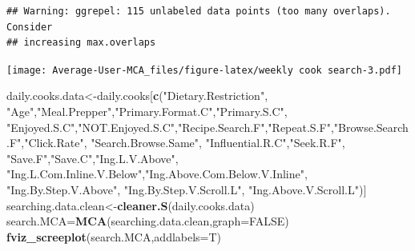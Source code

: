 \documentclass[
]{article}
\newenvironment{Shaded}{\begin{snugshade}}{\end{snugshade}}
\newcommand{\DataTypeTok}[1]{\textcolor[rgb]{0.13,0.29,0.53}{#1}}
\newcommand{\KeywordTok}[1]{\textcolor[rgb]{0.13,0.29,0.53}{\textbf{#1}}}
\newcommand{\NormalTok}[1]{#1}
\newcommand{\OtherTok}[1]{\textcolor[rgb]{0.56,0.35,0.01}{#1}}
\newcommand{\StringTok}[1]{\textcolor[rgb]{0.31,0.60,0.02}{#1}}
\begin{document}
\begin{Shaded}
\end{Shaded}

\begin{verbatim}
## Warning: ggrepel: 115 unlabeled data points (too many overlaps). Consider
## increasing max.overlaps
\end{verbatim}

\texttt{[image: Average-User-MCA\_files/figure-latex/weekly cook search-3.pdf]}

\begin{Shaded}
\begin{Highlighting}[]
\NormalTok{daily.cooks.data<-daily.cooks[}\KeywordTok{c}\NormalTok{(}\StringTok{"Dietary.Restriction"}\NormalTok{, }\StringTok{"Age"}\NormalTok{,}\StringTok{"Meal.Prepper"}\NormalTok{,}\StringTok{"Primary.Format.C"}\NormalTok{,}\StringTok{"Primary.S.C"}\NormalTok{,}
            \StringTok{"Enjoyed.S.C"}\NormalTok{,}\StringTok{"NOT.Enjoyed.S.C"}\NormalTok{,}\StringTok{"Recipe.Search.F"}\NormalTok{,}\StringTok{"Repeat.S.F"}\NormalTok{,}\StringTok{"Browse.Search.F"}\NormalTok{,}\StringTok{"Click.Rate"}\NormalTok{,}
            \StringTok{"Search.Browse.Same"}\NormalTok{, }\StringTok{"Influential.R.C"}\NormalTok{,}\StringTok{"Seek.R.F"}\NormalTok{, }\StringTok{"Save.F"}\NormalTok{,}\StringTok{"Save.C"}\NormalTok{,}\StringTok{"Ing.L.V.Above"}\NormalTok{,}
            \StringTok{"Ing.L.Com.Inline.V.Below"}\NormalTok{,}\StringTok{"Ing.Above.Com.Below.V.Inline"}\NormalTok{,  }\StringTok{"Ing.By.Step.V.Above"}\NormalTok{,  }\StringTok{"Ing.By.Step.V.Scroll.L"}\NormalTok{,}
            \StringTok{"Ing.Above.V.Scroll.L"}\NormalTok{)]}
\NormalTok{searching.data.clean<-}\KeywordTok{cleaner.S}\NormalTok{(daily.cooks.data)}
\NormalTok{search.MCA=}\KeywordTok{MCA}\NormalTok{(searching.data.clean,}\DataTypeTok{graph=}\OtherTok{FALSE}\NormalTok{)}
\KeywordTok{fviz_screeplot}\NormalTok{(search.MCA,}\DataTypeTok{addlabels=}\NormalTok{T)}
\end{Highlighting}
\end{Shaded}
\end{document}
